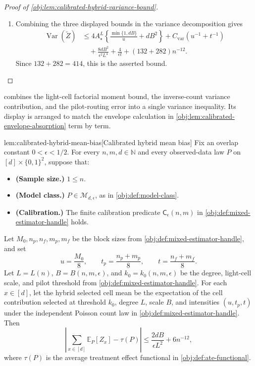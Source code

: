 \documentclass[11pt]{article}
\begin{document}
\begin{proof}[Proof of \cref{obj:lem:calibrated-hybrid-variance-bound}]
\begin{enumerate}
\item Combining the three displayed bounds in the variance decomposition gives
\[
\begin{aligned}
\operatorname{Var}(\widetilde Z)
&\le
4A_\star^L
\left\{
\frac{\min\{1,dB\}}{u}+dB^2
\right\}
+
C_{\mathrm{var}}\left(u^{-1}+t^{-1}\right)\\
&\quad+
\frac{8dB^2}{\epsilon^2L^4}
+
\frac{4}{\epsilon t}
+
(132+282)n^{-12}.
\end{aligned}
\]
Since \(132+282=414\), this is the asserted bound.
\end{enumerate}
\end{proof}

 combines the light-cell factorial moment bound, the inverse-count variance contribution, and the pilot-routing error into a single variance inequality. Its display is arranged to match the envelope calculation in \cref{obj:lem:calibrated-envelope-absorption} term by term.

\begin{lemmav}{lem:calibrated-hybrid-mean-bias}[Calibrated hybrid mean bias]
Fix an overlap constant \(0<\epsilon<1/2\).  For every \(n,m,d\in\mathbb N\) and every observed-data law \(P\) on \([d]\times\{0,1\}^2\), suppose that:
\begin{itemize}
\item \textbf{(Sample size.)} \(1\le n\).
\item \textbf{(Model class.)} \(P\in\mathcal M_{d,\epsilon}\), as in \cref{obj:def:model-class}.
\item \textbf{(Calibration.)} The finite calibration predicate \(\mathsf C_\epsilon(n,m)\) in \cref{obj:def:mixed-estimator-handle} holds.
\end{itemize}
Let \(M_0,n_p,n_f,m_p,m_f\) be the block sizes from \cref{obj:def:mixed-estimator-handle}, and set
\[
u=\frac{M_0}{8},\qquad
t_p=\frac{n_p+m_p}{8},\qquad
t=\frac{n_f+m_f}{8}.
\]
Let \(L=L(n)\), \(B=B(n,m,\epsilon)\), and \(k_0=k_0(n,m,\epsilon)\) be the degree, light-cell scale, and pilot threshold from \cref{obj:def:mixed-estimator-handle}.  For each \(x\in[d]\), let the hybrid selected cell mean be the expectation of the cell contribution selected at threshold \(k_0\), degree \(L\), scale \(B\), and intensities \((u,t_p,t)\) under the independent Poisson count law in \cref{obj:def:mixed-estimator-handle}.  Then
\[
\left|
\sum_{x\in[d]}
\mathbb E_P[Z_x]
-\tau(P)
\right|
\le
\frac{2dB}{\epsilon L^2}+6n^{-12},
\]
where \(\tau(P)\) is the average treatment effect functional in \cref{obj:def:ate-functional}.
\end{lemmav}
\end{document}
